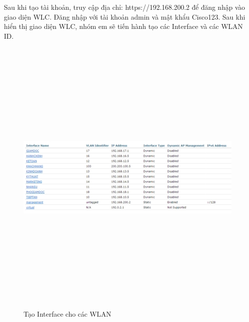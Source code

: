 \documentclass[12pt,a4paper]{report}
\begin{document}
\hspace*{1cm}Sau khi tạo tài khoản, truy cập địa chỉ: https://192.168.200.2 để đăng nhập vào giao diện WLC. Đăng nhập với tài khoản admin và mật khẩu Cisco123. Sau khi hiển thị giao diện WLC, nhóm em sẽ tiến hành tạo các Interface và các WLAN ID.\\
\begin{figure}[H]
    \centering
    \includegraphics[width=16cm, height=14cm]{img/interfaceWLAN.png}
    \caption{Tạo Interface cho các WLAN}
    \label{hinh46c}
\end{figure}
\end{document}
